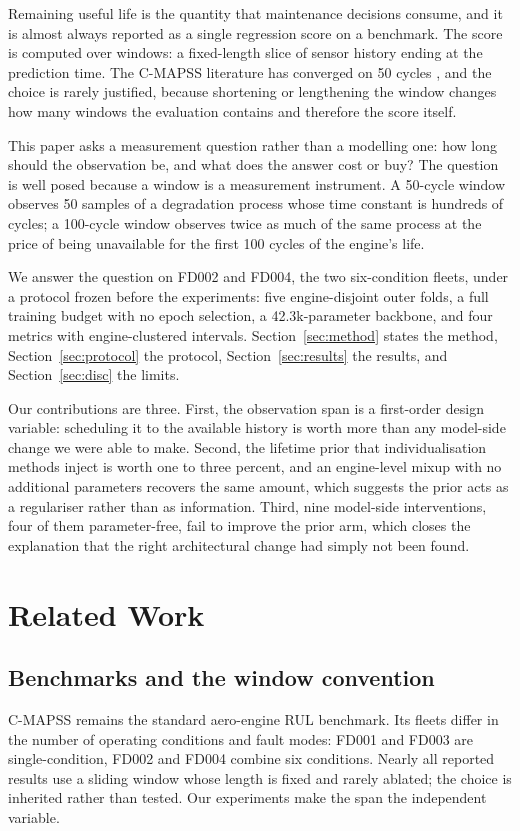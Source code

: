\documentclass[journal]{IEEEtran}
\begin{document}
Remaining useful life is the quantity that maintenance decisions consume, and it is almost always reported as a single regression score on a benchmark. The score is computed over windows: a fixed-length slice of sensor history ending at the prediction time. The C-MAPSS literature has converged on 50 cycles \cite{saxena2008}, and the choice is rarely justified, because shortening or lengthening the window changes how many windows the evaluation contains and therefore the score itself.

This paper asks a measurement question rather than a modelling one: how long should the observation be, and what does the answer cost or buy? The question is well posed because a window is a measurement instrument. A 50-cycle window observes 50 samples of a degradation process whose time constant is hundreds of cycles; a 100-cycle window observes twice as much of the same process at the price of being unavailable for the first 100 cycles of the engine's life.

We answer the question on FD002 and FD004, the two six-condition fleets, under a protocol frozen before the experiments: five engine-disjoint outer folds, a full training budget with no epoch selection, a 42.3k-parameter backbone, and four metrics with engine-clustered intervals. Section~\ref{sec:method} states the method, Section~\ref{sec:protocol} the protocol, Section~\ref{sec:results} the results, and Section~\ref{sec:disc} the limits.

Our contributions are three. First, the observation span is a first-order design variable: scheduling it to the available history is worth more than any model-side change we were able to make. Second, the lifetime prior that individualisation methods inject is worth one to three percent, and an engine-level mixup with no additional parameters recovers the same amount, which suggests the prior acts as a regulariser rather than as information. Third, nine model-side interventions, four of them parameter-free, fail to improve the prior arm, which closes the explanation that the right architectural change had simply not been found.

\section{Related Work}

\subsection{Benchmarks and the window convention}
C-MAPSS \cite{saxena2008} remains the standard aero-engine RUL benchmark. Its fleets differ in the number of operating conditions and fault modes: FD001 and FD003 are single-condition, FD002 and FD004 combine six conditions. Nearly all reported results use a sliding window whose length is fixed and rarely ablated; the choice is inherited rather than tested. Our experiments make the span the independent variable.
\end{document}
